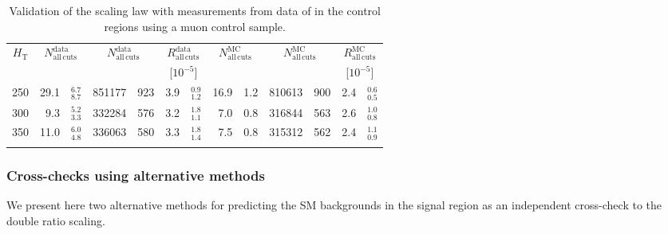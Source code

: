 \medskip
\begin{table}[!h]
  \begin{center}
    \caption{\label{tab:muon_validation} Validation of the scaling law
      with measurements from data of \RaT in the control regions using
      a muon control sample.}
    \begin{tabular}{cr@{$\ \pm\ $}lr@{$\ \pm\ $}lr@{$\ \pm\ $}lr@{$\ \pm\ $}lr@{$\ \pm\ $}lr@{$\ \pm\ $}l}
      \hline\noalign{\smallskip}
      $H_{\mathrm{T}}$ &
      \multicolumn{2}{c}{$N^{\mathrm{data}}_{\mathrm{all\, cuts}}$} &
      \multicolumn{2}{c}{$N^{\mathrm{data}}_{\mathrm{all\, cuts}}$} &
      \multicolumn{2}{c}{$R^{\mathrm{data}}_{\mathrm{all\, cuts}}$} &
      \multicolumn{2}{c}{$N^{\mathrm{MC}}_{\mathrm{all\, cuts}}$} &
      \multicolumn{2}{c}{$N^{\mathrm{MC}}_{\mathrm{all\, cuts}}$} &
      \multicolumn{2}{c}{$R^{\mathrm{MC}}_{\mathrm{all\, cuts}}$} \\
      &
      \multicolumn{2}{c}{} &
      \multicolumn{2}{c}{} &
      \multicolumn{2}{c}{[$10^{-5}$]} &
      \multicolumn{2}{c}{} &
      \multicolumn{2}{c}{} &
      \multicolumn{2}{c}{[$10^{-5}$]} \\
      \noalign{\smallskip}\hline\noalign{\smallskip}
      250 & 
      29.1&$^{6.7}_{8.7}$ & 
      851177&923 & 
      3.9&$^{0.9}_{1.2}$ & 
      16.9&1.2 &
      810613&900 &
      2.4&$^{0.6}_{0.5}$ \\
      300 &
      9.3&$^{5.2}_{3.3}$ & 
      332284&576 &
      3.2&$^{1.8}_{1.1}$ & 
      7.0&0.8 &
      316844&563 &
      2.6&$^{1.0}_{0.8}$ \\
      350 &
      11.0&$^{6.0}_{4.8}$ &
      336063&580 &
      3.3&$^{1.8}_{1.4}$  &
      7.5&0.8 &
      315312&562 &
      2.4&$^{1.1}_{0.9}$ \\
      \noalign{\smallskip}\hline
    \end{tabular}
  \end{center}
\end{table}



\subsubsection{Cross-checks using alternative methods}

We present here two alternative methods for predicting the SM
backgrounds in the signal region as an independent cross-check to the
double ratio scaling.

